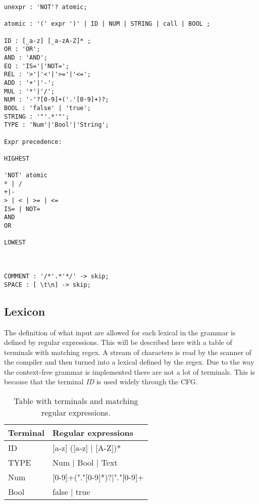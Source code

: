 \begin{lstlisting}[style=MyLang]
unexpr : 'NOT'? atomic;

atomic : '(' expr ')' | ID | NUM | STRING | call | BOOL ;

ID : [_a-z] [_a-zA-Z]* ;
OR : 'OR';
AND : 'AND';
EQ : 'IS='|'NOT=';
REL : '>'|'<'|'>='|'<=';
ADD : '+'|'-';
MUL : '*'|'/';
NUM : '-'?[0-9]+('.'[0-9]+)?;
BOOL : 'false' | 'true';
STRING : '"'.*'"';
TYPE : 'Num'|'Bool'|'String';

Expr precedence:
 
HIGHEST
 
'NOT' atomic 
* | /
+|-
> | < | >= | <=
IS= | NOT=
AND
OR
 
LOWEST



COMMENT : '/*'.*'*/' -> skip;
SPACE : [ \t\n] -> skip;

\end{lstlisting}


\subsection{Lexicon}
The definition of what input are allowed for each lexical in the grammar is defined by regular expressions. This will be described here with a table of terminals with matching regex. A stream of characters is read by the scanner of the compiler and then turned into a lexical defined by the regex.
Due to the way the context-free grammar is implemented there are not a lot of terminals. This is because that the terminal \emph{ID} is used widely through the CFG.  

\begin{table}[]
\centering
\label{fig:Lexicon}
\begin{tabular}{|l|l|}
\hline
Terminal & Regular expressions                \\ \hline
ID       & {[}a-z{]} ({[}a-z{]} | {[}A-Z{]})* \\ \hline
TYPE     & Num | Bool | Text                  \\ \hline
Num		 & [0-9]+("."[0-9]*)?|"."[0-9]+		  \\ \hline
Bool 	 & false | true						  \\ \hline
\end{tabular}
\caption{Table with terminals and matching regular expressions.}
\end{table}
